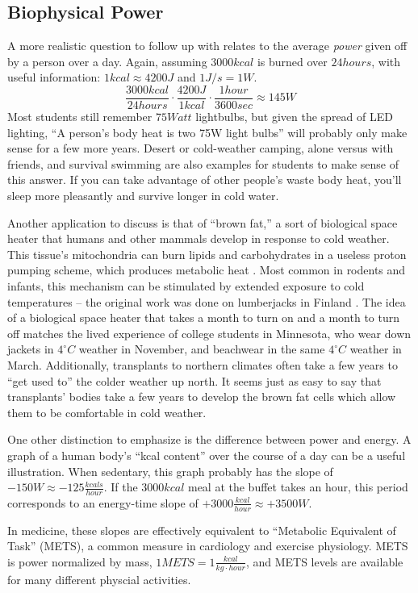 \documentclass[12pt]{iopart}
\newcommand{\be}{\begin{equation}}
\newcommand{\ee}{\end{equation}}
\newcommand{\degC}{^{\circ}C}
\begin{document}
\subsection{Biophysical Power}
A more realistic question to follow up with relates to the average \textit{power} given off by a person over a day.  
Again, assuming $3000kcal$ is burned over $24 hours$, with useful information: $1 kcal \approx 4200J$ and $1 J/s=1W$.
\be
\frac{3000kcal}{24hours}\cdot\frac{4200J}{1kcal}\cdot\frac{1hour}{3600sec}\approx145W
\ee
Most students still remember $75Watt$ lightbulbs, but given the spread of LED lighting, ``A person's body heat is two 75W light bulbs'' will probably only make sense for a few more years.  Desert or cold-weather camping, alone versus with friends, and survival swimming are also examples for students to make sense of this answer.  If you can take advantage of other people's waste body heat, you'll sleep more pleasantly and survive longer in cold water.  

Another application to discuss is that of ``brown fat,'' a sort of biological space heater that humans and other mammals develop in response to cold weather.  This tissue's mitochondria can burn lipids and carbohydrates in a useless proton pumping scheme, which produces metabolic heat \cite{brown_fat_1,brown_fat_2,brown_fat_3,brown_fat_4}.  Most common in rodents and infants, this mechanism can be stimulated by extended exposure to cold temperatures -- the original work was done on lumberjacks in Finland \cite{finland_lumberjacks} .  The idea of a biological space heater that takes a month to turn on and a month to turn off matches the lived experience of college students in Minnesota, who wear down jackets in $4\degC$ weather in November, and beachwear in the same $4\degC$ weather in March.  Additionally, transplants to northern climates often take a few years to ``get used to'' the colder weather up north. It seems just as easy to say that transplants' bodies take a few years to develop the brown fat cells which allow them to be comfortable in cold weather.

One other distinction to emphasize is the difference between power and energy.  A graph of a human body's ``kcal content'' over the course of a day can be a useful illustration.  When sedentary, this graph probably has the slope of $-150W\approx -125 \frac{kcals}{hour}$.  If the $3000kcal$ meal at the buffet takes an hour, this period corresponds to an energy-time slope of $+3000\frac{kcal}{hour}\approx +3500W$.  

In medicine, these slopes are effectively equivalent to ``Metabolic Equivalent of Task'' (METS), a common measure in cardiology and exercise physiology.  METS is power normalized by mass, $1METS=1\frac{kcal}{kg\cdot hour}$, and METS levels are available for many different physcial activities. \cite{METS}
\end{document}
